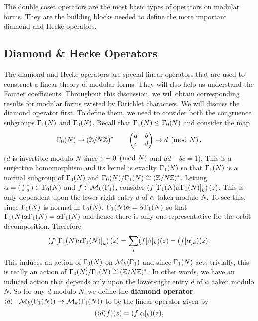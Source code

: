       The double coset operators are the most basic types of operators on modular forms. They are the building blocks needed to define the more important diamond and Hecke operators.
    \subsection*{Diamond \& Hecke Operators}
      The diamond and Hecke operators are special linear operators that are used to construct a linear theory of modular forms. They will also help us understand the Fourier coefficients. Throughout this discussion, we will obtain corresponding results for modular forms twisted by Dirichlet characters. We will discuss the diamond operator first. To define them, we need to consider both the congruence subgroups $\Gamma_{1}(N)$ and $\Gamma_{0}(N)$. Recall that $\Gamma_{1}(N) \le \Gamma_{0}(N)$ and consider the map
      \[
        \Gamma_{0}(N) \to (\mathbb{Z}/N\mathbb{Z})^{\ast} \qquad \begin{pmatrix} a & b \\ c & d\end{pmatrix} \to d \ \left(\text{mod }N\right),
      \]
      ($d$ is invertible modulo $N$ since $c \equiv 0 \ \left(\text{mod }N\right)$ and $ad-bc = 1$). This is a surjective homomorphism and its kernel is exaclty $\Gamma_{1}(N)$ so that $\Gamma_{1}(N)$ is a normal subgroup of $\Gamma_{0}(N)$ and $\Gamma_{0}(N)/\Gamma_{1}(N) \cong (\mathbb{Z}/N\mathbb{Z})^{\ast}$. Letting $\alpha = \begin{psmallmatrix} \ast & \ast \\ \ast & d \end{psmallmatrix} \in \Gamma_{0}(N)$ and $f \in \mathcal{M}_{k}(\Gamma_{1})$, consider $\left(f\left[\Gamma_{1}(N)\alpha\Gamma_{1}(N)\right]_{k}\right)(z)$. This is only dependent upon the lower-right entry $d$ of $\alpha$ taken modulo $N$. To see this, since $\Gamma_{1}(N)$ is normal in $\Gamma_{0}(N)$, $\Gamma_{1}(N)\alpha = \alpha\Gamma_{1}(N)$ so that $\Gamma_{1}(N)\alpha\Gamma_{1}(N) = \alpha\Gamma_{1}(N)$ and hence there is only one representative for the orbit decomposition. Therefore
      \[
        \left(f\left[\Gamma_{1}(N)\alpha\Gamma_{1}(N)\right]_{k}\right)(z) = \sum_{j}(f[\beta]_{k})(z) = (f[\alpha]_{k})(z).
      \]
      This induces an action of $\Gamma_{0}(N)$ on $\mathcal{M}_{k}(\Gamma_{1})$ and since $\Gamma_{1}(N)$ acts trivially, this is really an action of $\Gamma_{0}(N)/\Gamma_{1}(N) \cong (\mathbb{Z}/N\mathbb{Z})^{\ast}$. In other words, we have an induced action that depends only upon the lower-right entry $d$ of $\alpha$ taken modulo $N$. So for any $d$ modulo $N$, we define the \textbf{diamond operator} $\langle d\rangle:\mathcal{M}_{k}(\Gamma_{1}(N)) \to \mathcal{M}_{k}(\Gamma_{1}(N))$ to be the linear operator given by
      \[
        (\langle d\rangle f)(z) = (f[\alpha]_{k})(z),
      \]
